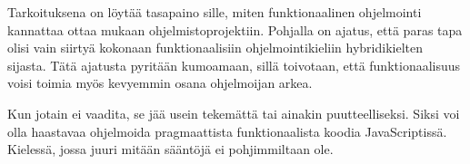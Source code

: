 Tarkoituksena on löytää tasapaino sille, miten funktionaalinen ohjelmointi kannattaa ottaa mukaan ohjelmistoprojektiin. Pohjalla on ajatus, että paras tapa olisi vain siirtyä kokonaan funktionaalisiin ohjelmointikieliin hybridikielten sijasta. Tätä ajatusta pyritään kumoamaan, sillä toivotaan, että funktionaalisuus voisi toimia myös kevyemmin osana ohjelmoijan arkea.

Kun jotain ei vaadita, se jää usein tekemättä tai ainakin puutteelliseksi. Siksi voi olla haastavaa ohjelmoida pragmaattista funktionaalista koodia JavaScriptissä. Kielessä, jossa juuri mitään sääntöjä ei pohjimmiltaan ole.
